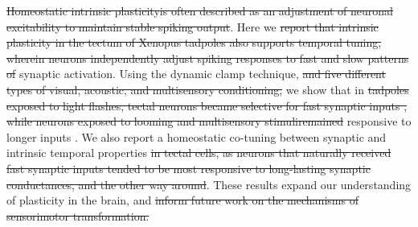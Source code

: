 \documentclass{article}
\providecommand{\DIFaddtex}[1]{{\protect\color{blue}{#1}}} %
\providecommand{\DIFdeltex}[1]{{\protect\color{red}\sout{#1}}}                      %
\providecommand{\DIFaddbegin}{} %
\providecommand{\DIFaddend}{} %
\providecommand{\DIFdelbegin}{} %
\providecommand{\DIFdelend}{} %
\providecommand{\DIFadd}[1]{\texorpdfstring{\DIFaddtex{#1}}{#1}} %
\providecommand{\DIFdel}[1]{\texorpdfstring{\DIFdeltex{#1}}{}} %
\newcommand{\DIFscaledelfig}{0.5}
\newlength{\DIFdelgraphicswidth} %
\newlength{\DIFdelgraphicsheight} %
\newcommand{\DIFaddincludegraphics}[2][]{{\color{blue}\fbox{\DIFOincludegraphics[#1]{#2}}}} %
\newcommand{\DIFdelincludegraphics}[2][]{%
\sbox{\DIFdelgraphicsbox}{\DIFOincludegraphics[#1]{#2}}%
\settoboxwidth{\DIFdelgraphicswidth}{\DIFdelgraphicsbox} %
\settoboxtotalheight{\DIFdelgraphicsheight}{\DIFdelgraphicsbox} %
\scalebox{\DIFscaledelfig}{%
\parbox[b]{\DIFdelgraphicswidth}{\usebox{\DIFdelgraphicsbox}\\[-\baselineskip] \rule{\DIFdelgraphicswidth}{0em}}\llap{\resizebox{\DIFdelgraphicswidth}{\DIFdelgraphicsheight}{%
\setlength{\unitlength}{\DIFdelgraphicswidth}%
\begin{picture}(1,1)%
\thicklines\linethickness{2pt} %
{\color[rgb]{1,0,0}\put(0,0){\framebox(1,1){}}}%
{\color[rgb]{1,0,0}\put(0,0){\line( 1,1){1}}}%
{\color[rgb]{1,0,0}\put(0,1){\line(1,-1){1}}}%
\end{picture}%
}\hspace*{3pt}}} %
} %
\DeclareRobustCommand{\DIFaddbegin}{\DIFOaddbegin \let\includegraphics\DIFaddincludegraphics} %
\DeclareRobustCommand{\DIFaddend}{\DIFOaddend \let\includegraphics\DIFOincludegraphics} %
\DeclareRobustCommand{\DIFdelbegin}{\DIFOdelbegin \let\includegraphics\DIFdelincludegraphics} %
\DeclareRobustCommand{\DIFdelend}{\DIFOaddend \let\includegraphics\DIFOincludegraphics} %
\begin{document}
\begin{flushleft}
\DIFdelbegin \DIFdel{Homeostatic intrinsic plasticityis often described as an adjustment of neuronal excitability to maintain stable spiking output}\DIFdelend \DIFaddbegin \DIFadd{For a biological neural network to be functional, its neurons need to be connected with synapses of appropriate strength, and each neuron needs to appropriately respond to its synaptic inputs. This second aspect of network tuning is maintained by intrinsic plasticity; yet it is often considered secondary to changes in connectivity, and mostly limited to adjustments of overall excitability of each neuron}\DIFaddend . Here we \DIFdelbegin \DIFdel{report that intrinsic plasticity in the tectum of Xenopus tadpoles also supports temporal tuning, wherein neurons independently adjust spiking responses to fast and slow patterns of }\DIFdelend \DIFaddbegin \DIFadd{argue that even non-oscillatory neurons can be tuned to inputs of different temporal dynamics, and that they can routinely adjust this tuning to match the statistics of their }\DIFaddend synaptic activation. Using the dynamic clamp technique, \DIFdelbegin \DIFdel{and five different types of visual, acoustic, and multisensory conditioning, }\DIFdelend we show that in \DIFdelbegin \DIFdel{tadpoles exposed to light flashes, tectal neurons became selective for fast synaptic inputs , while neurons exposed to looming and multisensory stimuliremained }\DIFdelend \DIFaddbegin \DIFadd{the tectum of Xenopus tadpoles, neurons become selective for faster inputs when animals are exposed to fast visual stimuli, but remain }\DIFaddend responsive to longer inputs \DIFaddbegin \DIFadd{in animals exposed to slower, looming or multisensory stimulation}\DIFaddend . We also report a homeostatic co-tuning between synaptic and intrinsic temporal properties \DIFdelbegin \DIFdel{in tectal cells, as neurons that naturally received fast synaptic inputs tended to be most responsive to long-lasting synaptic conductances, and the other way around}\DIFdelend \DIFaddbegin \DIFadd{of individual tectal cells}\DIFaddend . These results expand our understanding of \DIFaddbegin \DIFadd{intrinsic }\DIFaddend plasticity in the brain, and \DIFdelbegin \DIFdel{inform future work on the mechanisms of sensorimotor transformation.
}\DIFdelend \DIFaddbegin \DIFadd{suggest that there may exist an additional dimension of network tuning that has been so far overlooked.
}\DIFaddend 

\DIFdelbegin %


\end{flushleft}
\end{document}
